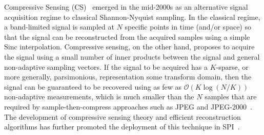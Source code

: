 Compressive Sensing (CS)~\cite{donoho2006compressed, candes2006compressive, baraniuk2014introduction, baraniuk2008simple} emerged in the mid-2000s as an alternative signal acquisition regime to classical Shannon-Nyquist sampling. In the classical regime, a band-limited signal is sampled at $N$ specific points in time (and/or space) so that the signal can be reconstructed from the acquired samples using a simple Sinc interpolation. Compressive sensing, on the other hand, proposes to acquire the signal using a small number of inner products between the signal and general non-adaptive sampling vectors. If the signal to be acquired has a $K$-sparse, or more generally, parsimonious, representation some transform domain, then the signal can be guaranteed to be recovered using as few as $\mathcal{O}(K\log(N/K))$ non-adaptive measurements, which is much smaller than the $N$ samples that are required by sample-then-compress approaches such as JPEG and JPEG-2000~\cite{skodras2001jpeg}. The development of compressive sensing theory and efficient reconstruction algorithms has further promoted the deployment of this technique in SPI~\cite{duarte2008single}.


